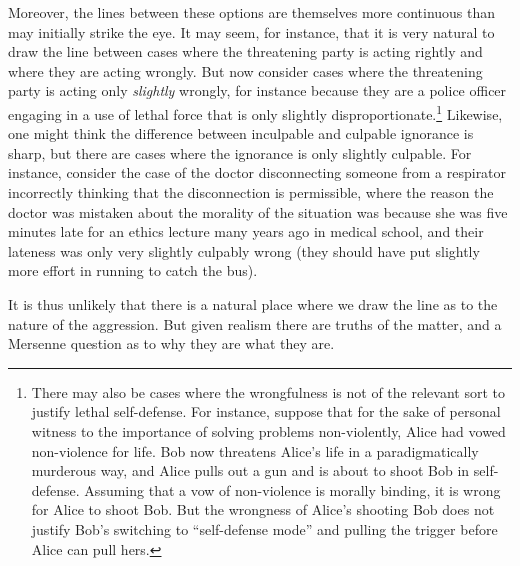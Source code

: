 Moreover, the lines between these options are themselves more continuous than may initially strike the eye. It may seem, for instance,
that it is very natural to draw the line between cases where the threatening party is acting rightly and where they are
acting wrongly. But now consider cases where the threatening party is acting only \textit{slightly} wrongly, for instance 
because they are a police officer engaging in a use of lethal force that is only slightly disproportionate.\footnote{There may
also be cases where the wrongfulness is not of the relevant sort to justify lethal self-defense. For instance, suppose that 
for the sake of personal witness to the importance of solving problems non-violently, Alice had vowed non-violence for life. Bob now threatens Alice's 
life in a paradigmatically murderous way, and Alice pulls out a gun and is about to shoot Bob in self-defense. Assuming that a vow of non-violence is morally 
binding, it is wrong for Alice to shoot Bob. But the wrongness of Alice's shooting Bob does not justify Bob's switching 
to ``self-defense mode'' and pulling the trigger before Alice can pull hers.} Likewise, one might think the difference between
inculpable and culpable ignorance is sharp, but there are cases where the ignorance is only slightly culpable. For instance, 
consider the case of the doctor disconnecting someone from a respirator incorrectly thinking that the disconnection is permissible,
where the reason the doctor was mistaken about the morality of the situation was because she was five minutes late for an 
ethics lecture many years ago in medical school, and their lateness was only very slightly culpably wrong (they should have 
put slightly more effort in running to catch the bus). 

It is thus unlikely that there is a natural place where we draw the line as to the nature of the aggression. But given realism there are
truths of the matter, and a Mersenne question as to why they are what they are.

